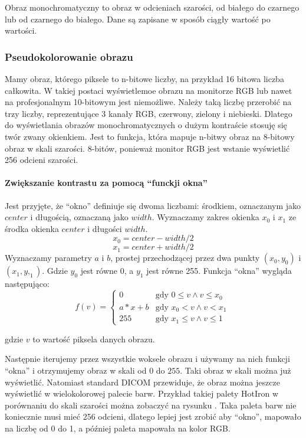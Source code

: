 \label{sec:algorithm-pixmap-monochrome}

Obraz monochromatyczny to obraz w odcieniach szarości, od białego do czarnego lub od czarnego do białego. Dane są zapisane w sposób ciągły wartość po wartości.

\subsubsection{Pseudokolorowanie obrazu}

Mamy obraz, którego piksele to n-bitowe liczby, na przykład 16 bitowa liczba całkowita.
W takiej postaci wyświetlemoe obrazu na monitorze RGB lub nawet na profesjonalnym 10-bitowym jest niemożliwe.
Należy taką liczbę przerobić na trzy liczby, reprezentujące 3 kanały RGB, czerwony, zielony i niebieski.
Dlatego do wyświetlania obrazów monochromatycznych o dużym kontraście stosuję się twór zwany okienkiem.
Jest to funkcja, która mapuje n-bitwy obraz na 8-bitowy obraz w skali szarości.
8-bitów, ponieważ monitor RGB jest wstanie wyświetlić 256 odcieni szarości.

\paragraph*{Zwiększanie kontrastu za pomocą \enquote{funckji okna}}
Jest przyjęte, że \enquote{okno} definiuje się dwoma liczbami: środkiem, oznaczanym jako $center$ i długością, oznaczaną jako $width$.
Wyznaczamy zakres okienka $x_0$ i $x_1$ ze środka okienka $center$ i długości $width$.
\[x_0 = center - width / 2\]
\[x_1 = center + width / 2\]
Wyznaczamy parametry $a$ i $b$, prostej przechodzącej przez dwa punkty $(x_0, y_0)$ i $(x_1, y,_1)$.
Gdzie $y_0$ jest równe 0, a $y_1$ jest równe 255.
Funkcja \enquote{okna} wygląda następująco:
\[
    f(v)=
    \begin{cases}
        0     & \text{gdy $0 \le v \wedge v \le x_0$ } \\
        a*x+b & \text{gdy $x_0 < v \wedge v < x_1$}    \\
        255   & \text{gdy $x_1 \le v \wedge v \le 1$ }
    \end{cases}
\]

gdzie $v$ to wartość piksela danych obrazu.

Następnie iterujemy przez wszystkie woksele obrazu i używamy na nich funkcji \enquote{okna} i otrzymujemy obraz w skali od $0$ do $255$.
Taki obraz w skali można już wyświetlić.
Natomiast standard DICOM przewiduje, że obraz można jeszcze wyświetlić w wielokolorowej palecie barw.
Przykład takiej palety HotIron w porównaniu do skali szarości można zobaczyć na rysunku .
Taka paleta barw nie koniecznie musi mieć 256 odcieni, dlatego lepiej jest zrobić aby \enquote{okno}, mapowało na liczbę od 0 do 1, a później paleta mapowała na kolor RGB.

